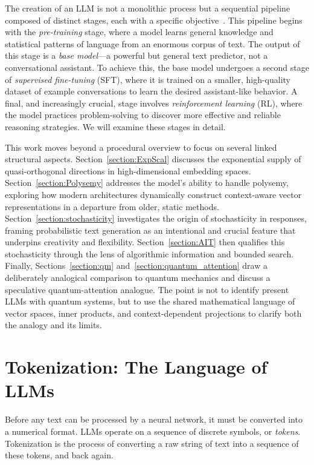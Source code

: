 \documentclass[%
  reprint,
  superscriptaddress,
  showpacs,
  showkeys,
  amsmath,amssymb,
  pra,
  longbibliography,
  floatfix,
  x11names
]{revtex4-2}
\begin{document}
The creation of an LLM is not a monolithic process but a sequential pipeline composed of distinct stages, each with a specific objective~\cite{karpathy2025intro}. This pipeline begins with the \textit{pre-training} stage, where a model learns general knowledge and statistical patterns of language from an enormous corpus of text. The output of this stage is a \textit{base model}---a powerful but general text predictor, not a conversational assistant. To achieve this, the base model undergoes a second stage of \textit{supervised fine-tuning} (SFT), where it is trained on a smaller, high-quality dataset of example conversations to learn the desired assistant-like behavior. A final, and increasingly crucial, stage involves \textit{reinforcement learning} (RL), where the model practices problem-solving to discover more effective and reliable reasoning strategies. We will examine these stages in detail.



This work moves beyond a procedural overview to focus on several linked structural aspects.
Section~\ref{section:ExpScal} discusses the exponential supply of quasi-orthogonal directions in high-dimensional embedding spaces.
Section~\ref{section:Polysemy} addresses the model's ability to handle polysemy, exploring how modern architectures dynamically construct context-aware vector representations in a departure from older, static methods.
Section~\ref{section:stochasticity} investigates the origin of stochasticity in responses, framing probabilistic text generation as an intentional and crucial feature that underpins creativity and flexibility.
Section~\ref{section:AIT} then qualifies this stochasticity through the lens of algorithmic information and bounded search.
Finally, Sections~\ref{section:qm} and~\ref{section:quantum_attention} draw a deliberately analogical comparison to quantum mechanics and discuss a speculative quantum-attention analogue. The point is not to identify present LLMs with quantum systems, but to use the shared mathematical language of vector spaces, inner products, and context-dependent projections to clarify both the analogy and its limits.



\section{Tokenization: The Language of LLMs}

Before any text can be processed by a neural network, it must be converted into a numerical format. LLMs operate on a sequence of discrete symbols, or \textit{tokens}. Tokenization is the process of converting a raw string of text into a sequence of these tokens, and back again.
\end{document}
